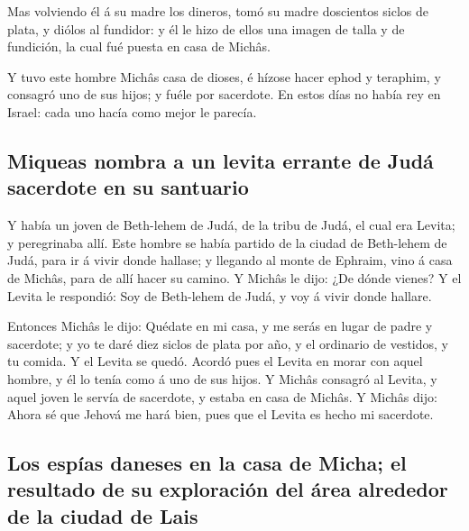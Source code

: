  Mas volviendo él á su madre los dineros, tomó su madre
doscientos siclos de plata, y diólos al fundidor: y él le hizo de ellos
una imagen de talla y de fundición, la cual fué puesta en casa de
Michâs.

 Y tuvo este hombre Michâs casa de dioses, é hízose hacer
ephod y teraphim, y consagró uno de sus hijos; y fuéle por sacerdote.
 En estos días no había rey en Israel: cada uno hacía como
mejor le parecía.

\hypertarget{miqueas-nombra-a-un-levita-errante-de-juduxe1-sacerdote-en-su-santuario}{%
\subsection{Miqueas nombra a un levita errante de Judá sacerdote en su
santuario}\label{miqueas-nombra-a-un-levita-errante-de-juduxe1-sacerdote-en-su-santuario}}

 Y había un joven de Beth-lehem de Judá, de la tribu de
Judá, el cual era Levita; y peregrinaba allí.  Este hombre
se había partido de la ciudad de Beth-lehem de Judá, para ir á vivir
donde hallase; y llegando al monte de Ephraim, vino á casa de Michâs,
para de allí hacer su camino.  Y Michâs le dijo: ¿De dónde
vienes? Y el Levita le respondió: Soy de Beth-lehem de Judá, y voy á
vivir donde hallare.

 Entonces Michâs le dijo: Quédate en mi casa, y me serás en
lugar de padre y sacerdote; y yo te daré diez siclos de plata por año, y
el ordinario de vestidos, y tu comida. Y el Levita se quedó.
 Acordó pues el Levita en morar con aquel hombre, y él lo
tenía como á uno de sus hijos.  Y Michâs consagró al
Levita, y aquel joven le servía de sacerdote, y estaba en casa de
Michâs.  Y Michâs dijo: Ahora sé que Jehová me hará bien,
pues que el Levita es hecho mi sacerdote.

\hypertarget{los-espuxedas-daneses-en-la-casa-de-micha-el-resultado-de-su-exploraciuxf3n-del-uxe1rea-alrededor-de-la-ciudad-de-lais}{%
\subsection{Los espías daneses en la casa de Micha; el resultado de su
exploración del área alrededor de la ciudad de
Lais}\label{los-espuxedas-daneses-en-la-casa-de-micha-el-resultado-de-su-exploraciuxf3n-del-uxe1rea-alrededor-de-la-ciudad-de-lais}}

